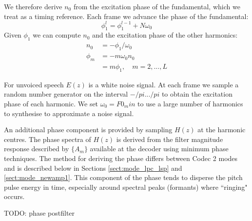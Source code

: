 \documentclass{article}
\begin{document}
We therefore derive $n_0$ from the excitation phase of the fundamental, which we treat as a timing reference.  Each frame we advance the phase of the fundamental:
\begin{equation}
\phi_1^l = \phi_1^{l-1} + N\omega_0
\end{equation}
Given $\phi_1$ we can compute $n_0$ and the excitation phase of the other harmonics:
\begin{equation}
\begin{split}
n_0    &= -\phi_1 / \omega_0 \\
\phi_m &= - m \omega_0 n_0 \\
       &= m \phi_1, \quad m=2,...,L
\end{split}
\end{equation}

For unvoiced speech $E(z)$ is a white noise signal.  At each frame we sample a random number generator on the interval $-/pi ... /pi$ to obtain the excitation phase of each harmonic.  We set $\omega_0 = F0_min$ to use a large number of harmonics to synthesise to approximate a noise signal.

An additional phase component is provided by sampling $H(z)$ at the harmonic centres.  The phase spectra of $H(z)$ is derived from the filter magnitude response described by $\{A_m\}$ available at the decoder using minimum phase techniques.  The method for deriving the phase differs between Codec 2 modes and is described below in Sections \ref{sect:mode_lpc_lsp} and \ref{sect:mode_newamp1}.  This component of the phase tends to disperse the pitch pulse energy in time, especially around spectral peaks (formants) where ``ringing" occurs.

TODO: phase postfilter
\end{document}

